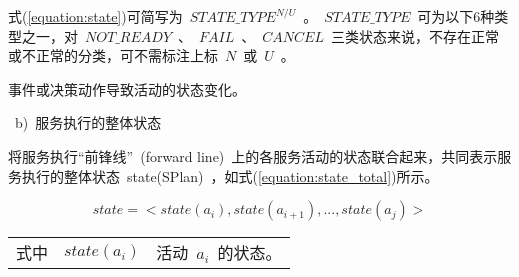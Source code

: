 式(\ref{equation:state})可简写为~$STATE\_TYPE^{N/U}$~。~$STATE\_TYPE$~可为以下6种类型之一，对~$NOT\_READY$~、~$FAIL$~、~$CANCEL$~三类状态来说，不存在正常或不正常的分类，可不需标注上标~$N$~或~$U$~。

%    
%    
%    
%    
%    
%    

事件或决策动作导致活动的状态变化。

~b)~服务执行的整体状态

将服务执行“前锋线”~(forward line)~上的各服务活动的状态联合起来，共同表示服务执行的整体状态~state(SPlan)~，如式(\ref{equation:state_total})所示。

\begin{equation}\label{equation:state_total}
state = < state(a_i),state(a_{i+1}),..., state(a_j)>
\end{equation}
\begin{tabularx}{\textwidth}{@{}l@{\quad}l@{\pozhehao }X@{}}
    式中
    & $state(a_i)$ & 活动~$a_i$~的状态。
\end{tabularx}\vspace{\wordsep}

